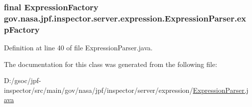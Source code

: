 \subsubsection[{\texorpdfstring{exp\+Factory}{expFactory}}]{\setlength{\rightskip}{0pt plus 5cm}final {\bf Expression\+Factory} gov.\+nasa.\+jpf.\+inspector.\+server.\+expression.\+Expression\+Parser.\+exp\+Factory\hspace{0.3cm}{\ttfamily [private]}}\hypertarget{classgov_1_1nasa_1_1jpf_1_1inspector_1_1server_1_1expression_1_1_expression_parser_ac104f9da945e44fd45fb00c2dfb83706}{}\label{classgov_1_1nasa_1_1jpf_1_1inspector_1_1server_1_1expression_1_1_expression_parser_ac104f9da945e44fd45fb00c2dfb83706}


Definition at line 40 of file Expression\+Parser.\+java.



The documentation for this class was generated from the following file\+:\begin{DoxyCompactItemize}
\item 
D\+:/gsoc/jpf-\/inspector/src/main/gov/nasa/jpf/inspector/server/expression/\hyperlink{_expression_parser_8java}{Expression\+Parser.\+java}\end{DoxyCompactItemize}

